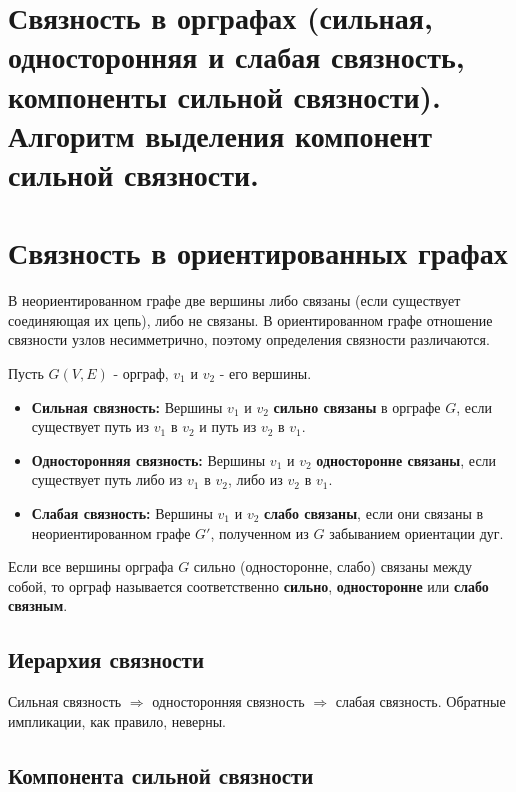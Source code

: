 {
	\section{Связность в орграфах (сильная, односторонняя и слабая связность, компоненты
сильной связности). Алгоритм выделения компонент сильной связности.}

\section*{Связность в ориентированных графах}

В неориентированном графе две вершины либо связаны (если существует соединяющая их цепь), либо не связаны.  
В ориентированном графе отношение связности узлов несимметрично, поэтому определения связности различаются.

Пусть $G(V, E)$ - орграф, $v_1$ и $v_2$ - его вершины.

\begin{itemize}
  \item \textbf{Сильная связность:}  
  Вершины $v_1$ и $v_2$ \textbf{сильно связаны} в орграфе $G$, если существует путь из $v_1$ в $v_2$ и путь из $v_2$ в $v_1$.

  \item \textbf{Односторонняя связность:}  
  Вершины $v_1$ и $v_2$ \textbf{односторонне связаны}, если существует путь либо из $v_1$ в $v_2$, либо из $v_2$ в $v_1$.

  \item \textbf{Слабая связность:}  
  Вершины $v_1$ и $v_2$ \textbf{слабо связаны}, если они связаны в неориентированном графе $G'$, полученном из $G$ забыванием ориентации дуг.
\end{itemize}

Если все вершины орграфа $G$ сильно (односторонне, слабо) связаны между собой, то орграф называется соответственно \textbf{сильно}, \textbf{односторонне} или \textbf{слабо связным}.

\subsection*{Иерархия связности}
Сильная связность $\Rightarrow$ односторонняя связность $\Rightarrow$ слабая связность.  
Обратные импликации, как правило, неверны.


\subsection*{Компонента сильной связности}

}
